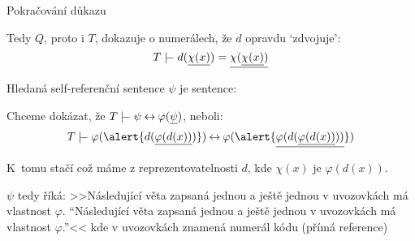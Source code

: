 \documentclass{beamer}
\begin{document}
\begin{frame}{Pokračování důkazu}

    Tedy $Q$, proto i $T$, dokazuje \alert{o numerálech}, že $d$ opravdu `zdvojuje':
    $$
    T\proves d(\underline{\chi(x)})=\underline{\chi(\underline{\chi(x)})}
    $$
        
    Hledaná self-referenční sentence $\psi$ je sentence:


    \bigskip

    Chceme dokázat, že $T\proves \psi \liff \varphi(\underline{\psi})$, neboli:
    $$
    T \proves \varphi(\alert{d(\underline{\varphi(d(x))})})\liff\varphi(\alert{\underline{\varphi(d(\underline{\varphi(d(x))}))}})
    $$
    
    K~tomu stačí  což máme z reprezentovatelnosti $d$, kde $\chi(x)$ je $\varphi(d(x))$.\hfill\qedsymbol

    {\footnotesize
    $\psi$ tedy říká: >>Následující věta zapsaná jednou a ještě jednou v uvozovkách má vlastnost $\varphi$. ``Následující věta zapsaná jednou a ještě jednou v uvozovkách má vlastnost $\varphi$.''<< kde v uvozovkách znamená numerál kódu (přímá reference)
    }

\end{frame}
\end{document}
